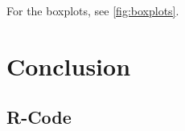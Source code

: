 \documentclass[a4paper,11pt,bibliography=totoc,numbers=noenddot]{scrartcl}\usepackage[]{graphicx}\usepackage[]{color}
\newcommand{\R}{\textrm{R}} %
\begin{document}
For the boxplots, see \vref{fig:boxplots}.



\newpage
\section{Conclusion}
\label{sec:Conclusion}

\blindtext[4]

\newpage
\setlength{\bibitemsep}{.45\baselineskip}



\begin{appendices}




\newpage
\section{\R-Code}
\label{app:code}

\end{appendices}


\end{document}
